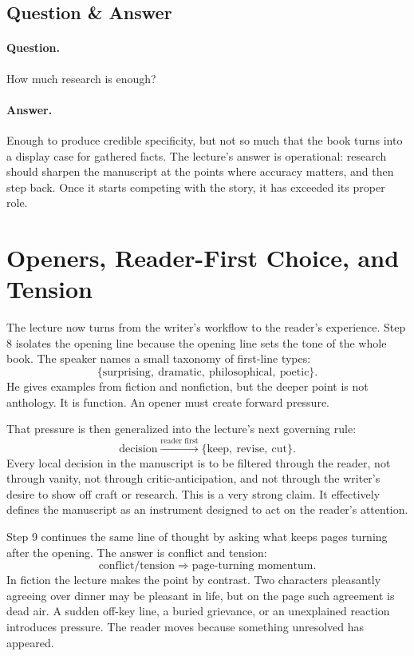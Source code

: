 \subsection{Question \& Answer}

\paragraph{Question.} How much research is enough?

\paragraph{Answer.} Enough to produce credible specificity, but not so much that the book turns into a display case for gathered facts. The lecture's answer is operational: research should sharpen the manuscript at the points where accuracy matters, and then step back. Once it starts competing with the story, it has exceeded its proper role.

\section{Openers, Reader-First Choice, and Tension}

The lecture now turns from the writer's workflow to the reader's experience. Step 8 isolates the opening line because the opening line sets the tone of the whole book. The speaker names a small taxonomy of first-line types:
\begin{equation}
\{\text{surprising},\ \text{dramatic},\ \text{philosophical},\ \text{poetic}\}.
\end{equation}
He gives examples from fiction and nonfiction, but the deeper point is not anthology. It is function. An opener must create forward pressure.

That pressure is then generalized into the lecture's next governing rule:
\begin{equation}
\text{decision} \xrightarrow{\text{reader first}} \{\text{keep},\ \text{revise},\ \text{cut}\}.
\end{equation}
Every local decision in the manuscript is to be filtered through the reader, not through vanity, not through critic-anticipation, and not through the writer's desire to show off craft or research. This is a very strong claim. It effectively defines the manuscript as an instrument designed to act on the reader's attention.

Step 9 continues the same line of thought by asking what keeps pages turning after the opening. The answer is conflict and tension:
\begin{equation}
\text{conflict/tension} \Rightarrow \text{page-turning momentum}.
\end{equation}
In fiction the lecture makes the point by contrast. Two characters pleasantly agreeing over dinner may be pleasant in life, but on the page such agreement is dead air. A sudden off-key line, a buried grievance, or an unexplained reaction introduces pressure. The reader moves because something unresolved has appeared.

